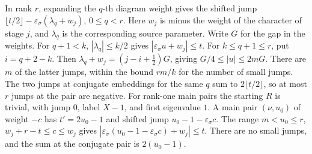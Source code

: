 In rank \(r\), expanding the \(q\)-th diagram weight gives the shifted jump
\(\lfloor t/2\rfloor-\varepsilon_\sigma(\lambda_q+w_j)\), \(0\le q<r\).
Here \(w_j\) is minus the weight of the character of stage \(j\), and \(\lambda_q\)
is the corresponding source parameter. Write \(G\) for the gap in the weights.
For \(q+1<k\), \(|\lambda_q|\le k/2\) gives \(|\varepsilon_\sigma u+w_j|\le t\).
For \(k\le q+1\le r\), put \(i=q+2-k\). Then
\(\lambda_q+w_j=(j-i+\tfrac12)G\), giving \(G/4\le |u|\le 2mG\).
There are \(m\) of the latter jumps, within the bound \(rm/k\) for the number of small jumps.
The two jumps at conjugate embeddings for the same \(q\) sum to \(2\lfloor t/2\rfloor\),
so at most \(r\) jumps at the pair are negative.
For rank-one main pairs the starting \(R\) is trivial, with jump \(0\), label \(X-1\),
and first eigenvalue \(1\). A main pair \((\nu,u_0)\) of weight \(-c\) has
\(t'=2u_0-1\) and shifted jump \(u_0-1-\varepsilon_\sigma c\).
The range \(m<u_0\le r\), \(w_j+r-t\le c\le w_j\) gives
\(|\varepsilon_\sigma(u_0-1-\varepsilon_\sigma c)+w_j|\le t\).
There are no small jumps, and the sum at the conjugate pair is \(2(u_0-1)\).

